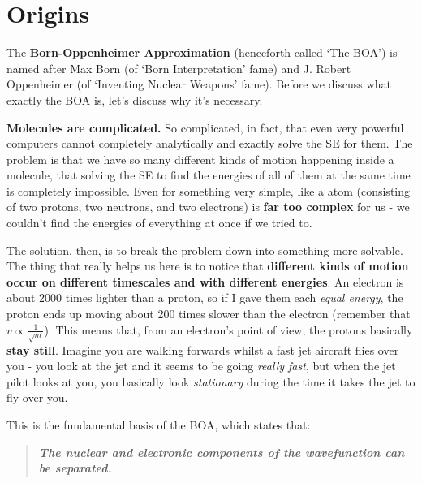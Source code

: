 \documentclass{memoir}[11pt,oneside,a4paper,openany]
\begin{document}
\section{Origins}
The \textbf{Born-Oppenheimer Approximation} (henceforth called `The BOA') is named after Max Born (of `Born Interpretation' fame) and J. Robert Oppenheimer (of `Inventing Nuclear Weapons' fame). Before we discuss what exactly the BOA is, let's discuss why it's necessary.

\textbf{Molecules are complicated.} So complicated, in fact, that even very powerful computers cannot completely analytically and exactly solve the SE for them. The problem is that we have so many different kinds of motion happening inside a molecule, that solving the SE to find the energies of all of them at the same time is completely impossible. Even for something very simple, like a  atom (consisting of two protons, two neutrons, and two electrons) is \textbf{far too complex} for us - we couldn't find the energies of everything at once if we tried to. 

The solution, then, is to break the problem down into something more solvable. The thing that really helps us here is to notice that \textbf{different kinds of motion occur on different timescales and with different energies}. An electron is about 2000 times lighter than a proton, so if I gave them each \emph{equal energy}, the proton ends up moving about 200 times slower than the electron (remember that $v \propto \frac{1}{\sqrt{m}}$). This means that, from an electron's point of view, the protons basically \textbf{stay still}. Imagine you are walking forwards whilst a fast jet aircraft flies over you - you look at the jet and it seems to be going \emph{really fast}, but when the jet pilot looks at you, you basically look \emph{stationary} during the time it takes the jet to fly over you. 

This is the fundamental basis of the BOA, which states that:
\begin{quote}
	\textbf{\emph{The nuclear and electronic components of the wavefunction can be separated.}}
\end{quote}
\end{document}

